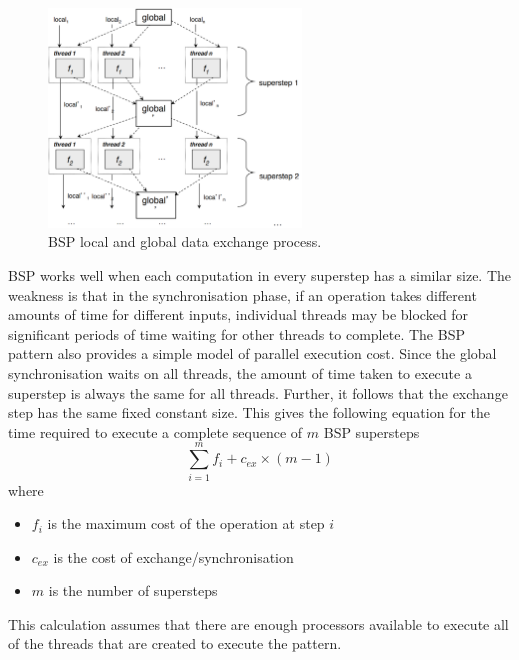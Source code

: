 \documentclass[CS4204-Notes.tex]{subfiles}
\begin{document}
\begin{figure}[H]
\centering
\includegraphics[width=0.6\textwidth, keepaspectratio]{imgs/bsp-exchange.png}
\caption{BSP local and global data exchange process.}
\end{figure}
\noindent
BSP works well when each computation in every superstep has a similar size. The weakness is that in the synchronisation phase, if an operation takes different amounts of time for different inputs, individual threads may be blocked for significant periods of time waiting for other threads to complete. 
\n
The BSP pattern also provides a simple model of parallel execution cost. Since the global synchronisation waits on all threads, the amount of time taken to execute a superstep is always the same for all threads. Further, it follows that the exchange step has the same fixed constant size. This gives the following equation for the time required to execute a complete sequence of $m$ BSP supersteps
\begin{equation}
\sum_{i=1}^{m}f_{i} + c_{ex} \times (m - 1)
\end{equation}
where 
\begin{itemize}
\item $f_{i}$ is the maximum cost of the operation at step $i$
\item $c_{ex}$ is the cost of exchange/synchronisation
\item $m$ is the number of supersteps
\end{itemize}
This calculation assumes that there are enough processors available to execute all of the threads that are created to execute the pattern. 
\end{document}
